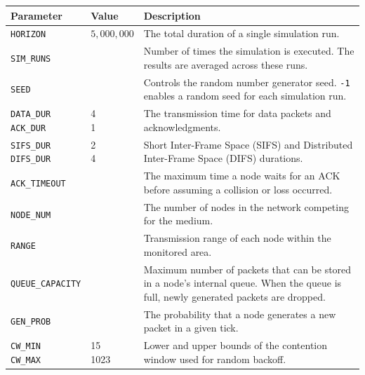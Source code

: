 \begin{table}[]
    \centering
    \begin{tabular}{|>{\raggedright\arraybackslash}                     p{}|
                    >{\centering\arraybackslash}p{}|
                    >{\raggedright\arraybackslash}p{}|}
        \hline
        \textbf{Parameter} &\textbf{Value} & \textbf{Description}
        \\\hline
        \texttt{HORIZON} & $5,000,000$ & The total duration of a single simulation run.
        \\\hline
        \texttt{SIM\_RUNS} & 20 & Number of times the simulation is executed. The results are averaged across these runs.
        \\\hline
        \texttt{SEED} & -1 & Controls the random number generator seed. \texttt{-1} enables a random seed for each simulation run.
        \\\hline
        \makecell[l]{\texttt{DATA\_DUR} \\ \texttt{ACK\_DUR}} & \makecell[c]{4 \\ 1} & The transmission time for data packets and acknowledgments.
        \\\hline
        \makecell[l]{\texttt{SIFS\_DUR} \\ \texttt{DIFS\_DUR}} & \makecell[c]{2 \\ 4} & 
        Short Inter-Frame Space (SIFS) and Distributed Inter-Frame Space (DIFS) durations.
        \\\hline
        \texttt{ACK\_TIMEOUT} & 8 & The maximum time a node waits for an ACK before assuming a collision or loss occurred.
        \\\hline
        \texttt{NODE\_NUM} & 15 & The number of nodes in the network competing for the medium.
        \\\hline
        \texttt{RANGE} & 3 & Transmission range of each node within the monitored area.
        \\\hline
        \texttt{QUEUE\_CAPACITY} & 50 & 
        Maximum number of packets that can be stored in a node’s internal queue. When the queue is full, newly generated packets are dropped.
        \\\hline
        \texttt{GEN\_PROB} & 0.003 & The probability that a node generates a new packet in a given tick.
        \\\hline
        \makecell[l]{\texttt{CW\_MIN} \\ \texttt{CW\_MAX}} & \makecell[c]{15 \\ 1023} & Lower and upper bounds of the contention window used for random backoff.

\end{tabular}
\end{table}
